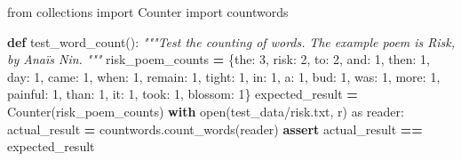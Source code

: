 \documentclass[
]{krantz}
\makeatletter
\newenvironment{Shaded}{\begin{snugshade}}{\end{snugshade}}
\newcommand{\BuiltInTok}[1]{#1}
\newcommand{\CommentTok}[1]{\textcolor[rgb]{0.56,0.35,0.01}{\textit{#1}}}
\newcommand{\ControlFlowTok}[1]{\textcolor[rgb]{0.13,0.29,0.53}{\textbf{#1}}}
\newcommand{\DecValTok}[1]{\textcolor[rgb]{0.00,0.00,0.81}{#1}}
\newcommand{\ImportTok}[1]{#1}
\newcommand{\KeywordTok}[1]{\textcolor[rgb]{0.13,0.29,0.53}{\textbf{#1}}}
\newcommand{\NormalTok}[1]{#1}
\newcommand{\OperatorTok}[1]{\textcolor[rgb]{0.81,0.36,0.00}{\textbf{#1}}}
\newcommand{\StringTok}[1]{\textcolor[rgb]{0.31,0.60,0.02}{#1}}
\newenvironment{kframe}{%
\medskip{}
\setlength{\fboxsep}{.8em}
 \def\at@end@of@kframe{}%
 \ifinner\ifhmode%
  \def\at@end@of@kframe{\end{minipage}}%
  \begin{minipage}{\columnwidth}%
 \fi\fi%
 \def\FrameCommand##1{\hskip\@totalleftmargin \hskip-\fboxsep
 \colorbox{shadecolor}{##1}\hskip-\fboxsep
     \hskip-\linewidth \hskip-\@totalleftmargin \hskip\columnwidth}%
 \MakeFramed {\advance\hsize-\width
   \@totalleftmargin\z@ \linewidth\hsize
   \@setminipage}}%
 {\par\unskip\endMakeFramed%
 \at@end@of@kframe}
\renewenvironment{Shaded}{\begin{kframe}}{\end{kframe}}
\makeatother
\begin{document}
\begin{Shaded}
\begin{Highlighting}[]
\ImportTok{from}\NormalTok{ collections }\ImportTok{import}\NormalTok{ Counter}
\ImportTok{import}\NormalTok{ countwords}

\KeywordTok{def}\NormalTok{ test\_word\_count():}
    \CommentTok{"""Test the counting of words.}
\CommentTok{    }
\CommentTok{    The example poem is Risk, by Anaïs Nin.}
\CommentTok{    """}
\NormalTok{    risk\_poem\_counts }\OperatorTok{=}\NormalTok{ \{}\StringTok{\textquotesingle{}the\textquotesingle{}}\NormalTok{: }\DecValTok{3}\NormalTok{, }\StringTok{\textquotesingle{}risk\textquotesingle{}}\NormalTok{: }\DecValTok{2}\NormalTok{, }\StringTok{\textquotesingle{}to\textquotesingle{}}\NormalTok{: }\DecValTok{2}\NormalTok{, }\StringTok{\textquotesingle{}and\textquotesingle{}}\NormalTok{: }\DecValTok{1}\NormalTok{, }\StringTok{\textquotesingle{}then\textquotesingle{}}\NormalTok{: }\DecValTok{1}\NormalTok{,}
                        \StringTok{\textquotesingle{}day\textquotesingle{}}\NormalTok{: }\DecValTok{1}\NormalTok{, }\StringTok{\textquotesingle{}came\textquotesingle{}}\NormalTok{: }\DecValTok{1}\NormalTok{, }\StringTok{\textquotesingle{}when\textquotesingle{}}\NormalTok{: }\DecValTok{1}\NormalTok{, }\StringTok{\textquotesingle{}remain\textquotesingle{}}\NormalTok{: }\DecValTok{1}\NormalTok{, }\StringTok{\textquotesingle{}tight\textquotesingle{}}\NormalTok{: }\DecValTok{1}\NormalTok{,}
                        \StringTok{\textquotesingle{}in\textquotesingle{}}\NormalTok{: }\DecValTok{1}\NormalTok{, }\StringTok{\textquotesingle{}a\textquotesingle{}}\NormalTok{: }\DecValTok{1}\NormalTok{, }\StringTok{\textquotesingle{}bud\textquotesingle{}}\NormalTok{: }\DecValTok{1}\NormalTok{, }\StringTok{\textquotesingle{}was\textquotesingle{}}\NormalTok{: }\DecValTok{1}\NormalTok{, }\StringTok{\textquotesingle{}more\textquotesingle{}}\NormalTok{: }\DecValTok{1}\NormalTok{,}
                        \StringTok{\textquotesingle{}painful\textquotesingle{}}\NormalTok{: }\DecValTok{1}\NormalTok{, }\StringTok{\textquotesingle{}than\textquotesingle{}}\NormalTok{: }\DecValTok{1}\NormalTok{, }\StringTok{\textquotesingle{}it\textquotesingle{}}\NormalTok{: }\DecValTok{1}\NormalTok{, }\StringTok{\textquotesingle{}took\textquotesingle{}}\NormalTok{: }\DecValTok{1}\NormalTok{, }\StringTok{\textquotesingle{}blossom\textquotesingle{}}\NormalTok{: }\DecValTok{1}\NormalTok{\}}
\NormalTok{    expected\_result }\OperatorTok{=}\NormalTok{ Counter(risk\_poem\_counts)}
    \ControlFlowTok{with} \BuiltInTok{open}\NormalTok{(}\StringTok{\textquotesingle{}test\_data/risk.txt\textquotesingle{}}\NormalTok{, }\StringTok{\textquotesingle{}r\textquotesingle{}}\NormalTok{) }\ImportTok{as}\NormalTok{ reader:}
\NormalTok{        actual\_result }\OperatorTok{=}\NormalTok{ countwords.count\_words(reader)}
    \ControlFlowTok{assert}\NormalTok{ actual\_result }\OperatorTok{==}\NormalTok{ expected\_result}
\end{Highlighting}
\end{Shaded}
\end{document}
